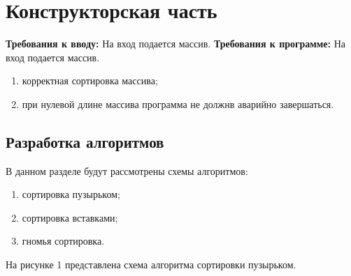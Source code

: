 \documentclass[a4paper, 12pt]{article}
\begin{document}
\newpage
\section{Конструкторская часть}
\begin{flushleft}
	{\bf Требования к вводу: } На вход подается массив.
	{\bf Требования к программе: } На вход подается массив.
	\begin{enumerate}
		\item корректная сортировка массива;
		\item при нулевой длине массива программа не должнв аварийно завершаться. 
	\end{enumerate}

	\subsection{Разработка алгоритмов}
	В данном разделе будут рассмотрены схемы алгоритмов:
	\begin{enumerate}
		\item сортировка пузырьком;
		\item сортировка вставками;
		\item гномья сортировка.
	\end{enumerate}
	\clearpage
	\newpage
	\hspace*{5mm} На рисунке 1 представлена схема алгоритма сортировки пузырьком.
	\begin{figure}[h!]

\end{figure}
\end{flushleft}
\end{document}
